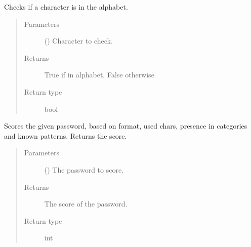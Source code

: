 \documentclass[letterpaper,10pt,english]{sphinxmanual}
\begin{document}
\begin{fulllineitems}
\begin{fulllineitems}
\label{\detokenize{EntroPass:EntroPass.pwd_score.Pwd_score.isalphabet}}
\sphinxAtStartPar
Checks if a character is in the alphabet.
\begin{quote}\begin{description}
\item[{Parameters}] \leavevmode
\sphinxAtStartPar
{} () \textendash{} Character to check.

\item[{Returns}] \leavevmode
\sphinxAtStartPar
True if in alphabet, False otherwise

\item[{Return type}] \leavevmode
\sphinxAtStartPar
bool

\end{description}\end{quote}

\end{fulllineitems}


\begin{fulllineitems}
\label{\detokenize{EntroPass:EntroPass.pwd_score.Pwd_score.score_pwd}}
\sphinxAtStartPar
Scores the given password, based on format, used chars, presence in categories
and known patterns. Returns the score.
\begin{quote}\begin{description}
\item[{Parameters}] \leavevmode
\sphinxAtStartPar
{} () \textendash{} The password to score.

\item[{Returns}] \leavevmode
\sphinxAtStartPar
{} \textendash{} The score of the password.

\item[{Return type}] \leavevmode
\sphinxAtStartPar
int

\end{description}\end{quote}


\end{fulllineitems}
\end{fulllineitems}
\end{document}

